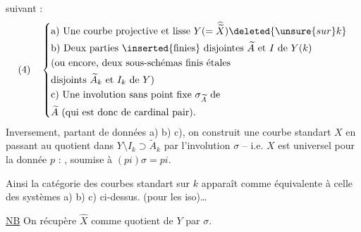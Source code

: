 suivant :
\[
(4)\quad\left\{\begin{aligned}
&\text{a) Une courbe projective et lisse }Y(=\widehat{\widetilde X})\deleted{\unsure{sur }k}\\
&\text{b) Deux parties }\inserted{\text{finies}}\text{ disjointes }\widetilde A\text{ et }I\text{ de }Y(k)\\
&\text{(ou encore, deux sous-schémas finis étales}\\
&\text{disjoints }\widetilde A_k\text{ et }I_k\text{ de }Y\text{)}\\
&\text{c) Une involution sans point fixe }\sigma_{\widetilde A}\text{ de}\\
&\widetilde A\text{ (qui est donc de cardinal pair).}
\end{aligned}\right.
\]
Inversement, partant de données a) b) c), on construit une courbe standart $X$ en passant au quotient dans $Y\setminus I_k\supset\widetilde A_k$ par l'involution $\sigma$ -- i.e. $X$ est universel  pour la donnée $p$ :
, soumise à $(pi)\sigma=pi$.

Ainsi la catégorie des courbes standart sur $k$  apparaît comme équivalente à celle des systèmes a) b) c) ci-dessus. (pour les iso)\ldots

\uline{NB} On récupère $\widehat X$ comme quotient de $Y$ par $\sigma$.
